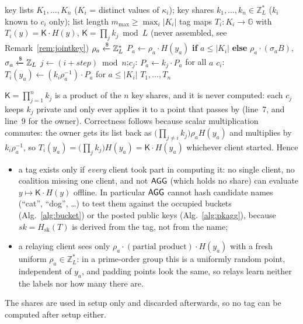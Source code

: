 \begin{algorithm}[t]
\caption{$\mathsf{RingOPRF}$: tags under a joint key nobody holds}
\label{alg:oprf}
\begin{algorithmic}[1]
\Require key lists $K_1,\dots,K_n$ ($K_i$ = distinct values of $\kappa_i$); key shares
  $k_1,\dots,k_n\in\mathbb{Z}_L^*$ ($k_i$ known to $c_i$ only); list length $m_{\max}\ge\max_i|K_i|$
\Ensure tag maps $T_i:K_i\to\mathbb{G}$ with $T_i(y)=\mathsf{K}\cdot H(y)$, $\mathsf{K}=\prod_j k_j \bmod L$ (never assembled, see Remark~\ref{rem:jointkey})
    \State $\rho_a\xleftarrow{\$}\mathbb{Z}_L^*$
    \State $P_a\gets \rho_a\cdot H(y_a)$ \textbf{if} $a\le|K_i|$ \textbf{else} $\rho_a\cdot(\sigma_a B)$, $\sigma_a\xleftarrow{\$}\mathbb{Z}_L$ 
  \EndFor
   
    \State $j\gets(i+\mathit{step})\bmod n$;\quad $c_j$: $P_a\gets k_j\cdot P_a$ for all $a$
  \EndFor
  \State $c_i$: $T_i(y_a)\gets (k_i\rho_a^{-1})\cdot P_a$ for $a\le|K_i|$ 
\EndFor
\State \Return $T_1,\dots,T_n$
\end{algorithmic}
\end{algorithm}

\begin{remark}\label{rem:jointkey}
$\mathsf{K}=\prod_{j=1}^n k_j$ is a product of the $n$ key shares, and it is never computed: each
$c_j$ keeps $k_j$ private and only ever applies it to a point that passes by (line~7, and line~9 for the
owner). Correctness follows because scalar multiplication commutes: the owner gets its list back as
$\bigl(\prod_{j\neq i}k_j\bigr)\rho_a H(y_a)$ and multiplies by $k_i\rho_a^{-1}$, so
$T_i(y_a)=\bigl(\prod_j k_j\bigr)H(y_a)=\mathsf{K}\cdot H(y_a)$ whichever client started. Hence
\begin{itemize}
  \item a tag exists only if \emph{every} client took part in computing it: no single client, no
        coalition missing one client, and not $\mathsf{AGG}$ (which holds no share) can evaluate
        $y\mapsto\mathsf{K}\cdot H(y)$ offline. In particular $\mathsf{AGG}$ cannot hash candidate names
        (``cat'', ``dog'', \dots) to test them against the occupied buckets (Alg.~\ref{alg:bucket}) or
        the posted public keys (Alg.~\ref{alg:pkagg}), because $sk=H_{\mathrm{sk}}(T)$ is derived from
        the tag, not from the name;
  \item a relaying client sees only $\rho_a\cdot(\text{partial product})\cdot H(y_a)$ with a fresh
        uniform $\rho_a\in\mathbb{Z}_L^*$: in a prime-order group this is a uniformly random point,
        independent of $y_a$, and padding points look the same, so relays learn neither the
        labels nor how many there are.
\end{itemize}
The shares are used in setup only and discarded afterwards, so no tag can be computed after
setup either.
\end{remark}

